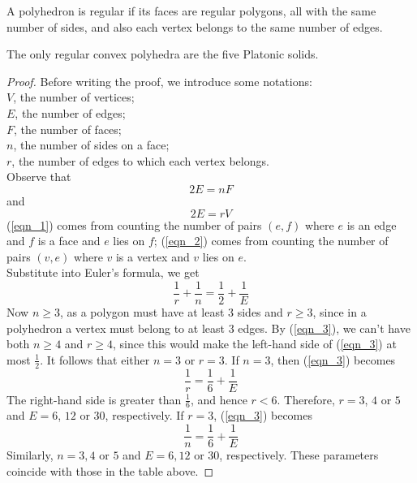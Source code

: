 \documentclass[../main.tex]{subfiles}
\begin{document}
\begin{definition}
    A polyhedron is regular if its faces are regular polygons, all with the same number of sides, and also each vertex belongs to the same number of edges.
\end{definition}

\begin{theorem}\cite{liebeck2019concise}
The only regular convex polyhedra are the five Platonic solids.
\begin{proof}
Before writing the proof, we introduce some notations:\\
$V$, the number of vertices;\\
$E$, the number of edges;\\
$F$, the number of faces;\\
$n$, the number of sides on a face;\\
$r$, the number of edges to which each vertex belongs.\\
Observe that 
\begin{equation}\label{eqn_1}
2E=nF
\end{equation}
and
\begin{equation}\label{eqn_2}
2E=rV
\end{equation}
(\ref{eqn_1}) comes from counting the number of pairs $(e,f)$ where $e$ is an edge and $f$ is a face and $e$ lies on $f$; (\ref{eqn_2}) comes from counting the number of pairs $(v,e)$ where $v$ is a vertex and $v$ lies on $e$.\\
Substitute into Euler's formula, we get 
\begin{equation}\label{eqn_3}
\frac{1}{r}+\frac{1}{n}=\frac{1}{2}+\frac{1}{E}
\end{equation}
Now $n\geq 3$, as a polygon must have at least $3$ sides and $r\geq 3$, since in a polyhedron a vertex must belong to at least $3$ edges. By (\ref{eqn_3}), we can't have both $n\geq 4$ and $r \geq 4$, since this would make the left-hand side of (\ref{eqn_3}) at most $\frac{1}{2}$.
It follows that either $n = 3$ or $r = 3$.
If $n = 3$, then (\ref{eqn_3}) becomes
\begin{equation}\label{eqn_4}
\frac{1}{r}=\frac{1}{6}+\frac{1}{E}
\end{equation}
The right-hand side is greater than $\frac{1}{6}$, and hence $r < 6$. Therefore, $r = 3$, $4$ or $5$ and $E = 6$, $12$ or $30$, respectively.
If $r = 3$, (\ref{eqn_3}) becomes
\begin{equation}\label{eqn_5}
\frac{1}{n}=\frac{1}{6}+\frac{1}{E}
\end{equation}
Similarly, $n = 3,4$ or $5$ and $E = 6,12$ or $30$, respectively.
These parameters coincide with those in the table above.
\end{proof}
\end{theorem}
\end{document}
